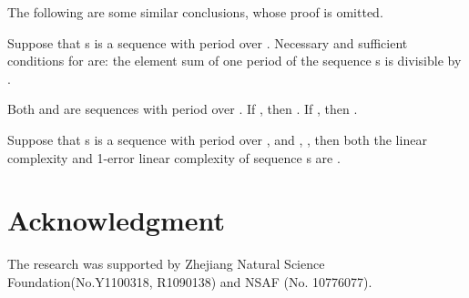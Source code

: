 \documentclass[10pt,conference,twocolumn]{IEEEtran}
\begin{document}
The following are some similar conclusions, whose proof is omitted.

   Suppose that s is a sequence with
period  over . Necessary and sufficient conditions for
 are: the element sum of one period of the sequence s is
divisible by .

 Both  and  are sequences with
period  over .  If  , then
. If , then
.

   Suppose that s is a sequence with
period  over , and  ,
, then both the linear complexity and 1-error
linear complexity of sequence s are .




 \section*{ Acknowledgment}
 The research was supported by
Zhejiang Natural Science Foundation(No.Y1100318, R1090138) and NSAF
(No. 10776077).
\end{document}
